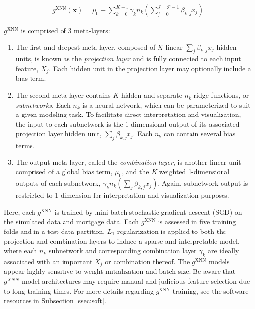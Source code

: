 \documentclass[information,article,submit,moreauthors,pdftex]{definitions/mdpi}
\begin{document}
\begin{equation}
\begin{aligned}
\label{eq:xnn}
g^{\text{XNN}}(\mathbf{x}) = \mu_0 + \sum_{k=0}^{K-1}\gamma_k n_k(\sum^{J=\mathcal{P}-1}_{j=0}\beta_{k, j}x_j)
\end{aligned}
\end{equation}

\noindent $g^{\text{XNN}}$ is comprised of 3 meta-layers:

\begin{enumerate}[leftmargin=*,labelsep=4.9mm]
\item The first and deepest meta-layer, composed of $K$ linear $\sum_j\beta_{k,j}x_j$ hidden units, is known as the \textit{projection layer} and is fully connected to each input feature, $X_j$. Each hidden unit in the projection layer may optionally include a bias term.
\item The second meta-layer contains $K$ hidden and separate $n_k$ ridge functions, or \textit{subnetworks}. Each $n_k$ is a neural network, which can be parameterized to suit a given modeling task. To facilitate direct interpretation and visualization, the input to each subnetwork is the 1-dimensional output of its associated projection layer hidden unit, $\sum_j\beta_{k,j}x_j$. Each $n_k$ can contain several bias terms.
\item The output meta-layer, called the \textit{combination layer}, is another linear unit comprised of a global bias term, $\mu_0$, and the $K$ weighted 1-dimensional outputs of each subnetwork, $\gamma_kn_k(\sum_j\beta_{k,j}x_j)$. Again, subnetwork output is restricted to 1-dimension for interpretation and visualization purposes.
\end{enumerate}

Here, each $g^\text{XNN}$ is trained by mini-batch stochastic gradient descent (SGD) on the simulated data and mortgage data. Each $g^\text{XNN}$ is assessed in five training folds and in a test data partition. $L_1$ regularization is applied to both the projection and combination layers to induce a sparse and interpretable model, where each $n_k$ subnetwork and corresponding combination layer $\gamma_k$ are ideally associated with an important $X_j$ or combination thereof. The $g^\text{XNN}$ models appear highly sensitive to weight initialization and batch size. Be aware that $g^{XNN}$ model architectures may require manual and judicious feature selection due to long training times. For more details regarding $g^\text{XNN}$ training, see the software resources in Subsection \ref{ssec:soft}. 
\end{document}
